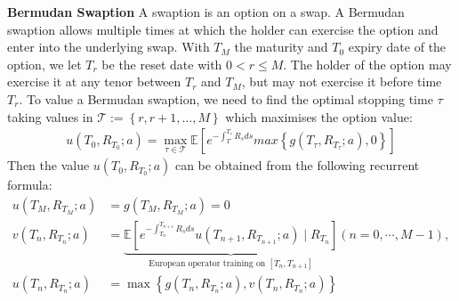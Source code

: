 \documentclass[11pt,a4paper]{article}
\theoremstyle{remark}
\begin{document}
	\noindent \textbf{Bermudan Swaption}
	A swaption is an option on a swap. A Bermudan swaption allows multiple times at which the holder can exercise the option and enter into the underlying swap. With $T_M$ the maturity and $T_0$ expiry date of the option, we let $T_r$ be the reset date with $0 < r \leq M$. The holder of the option may exercise it at any tenor between $T_r$ and $T_M$, but may not exercise it before time $T_r$. To value a Bermudan swaption, we need to find the optimal stopping time $\tau$ taking values in $\mathcal{T}:=\left\{r, r+1, \ldots, M\right\}$ which maximises the option value:
	\begin{align}
		u\left(T_0, R_{T_0}; a\right)=\max _{\tau \in \mathcal{T}} \mathbb{E}\left[e^{-\int_{T}^{T_{\tau}}R_s ds} max\left\{g(T_{\tau},R_{T_{\tau}}; a) ,0\right\}\right]
	\end{align}
	Then the value $u\left(T_0,R_{T_0}; a\right)$ can be obtained from the following recurrent formula:
	\begin{align}
		u(T_M, R_{T_M}; a) &= g(T_M, R_{T_M}; a) = 0\\
		v(T_n, R_{T_n}; a) &=\underbrace{ \mathbb{E}\left[e^{-\int_{T_n}^{T_{n+1}}R_s ds}u\left(T_{n+1}, R_{T_{n+1}}; a\right) \mid R_{T_{n}} \right]}_{\text{European operator training on $[T_n, T_{n+1}]$}} (n = 0,\cdots, M-1),\\
		u(T_n, R_{T_n}; a) &= \max \left\{g(T_n, R_{T_n}; a),  v(T_n, R_{T_n}; a)\right\}
	\end{align}
	
\end{document}
